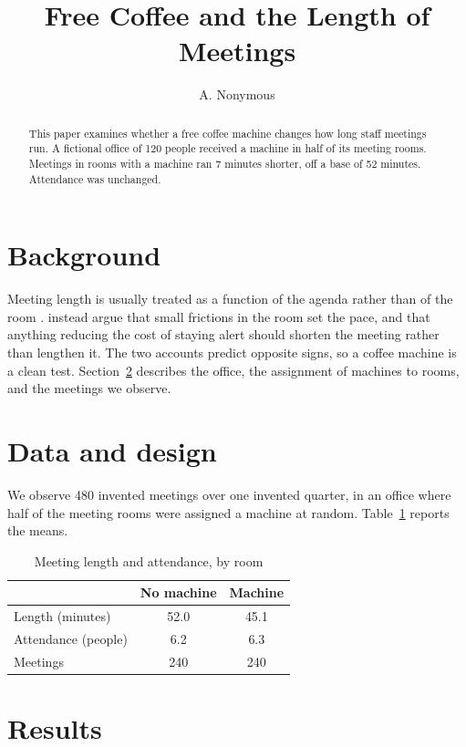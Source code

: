 \documentclass{article}
\title{Free Coffee and the Length of Meetings}
\author{A. Nonymous}
\date{}
\begin{document}
\maketitle

\begin{abstract}
This paper examines whether a free coffee machine changes how long staff
meetings run. A fictional office of 120 people received a machine in half of
its meeting rooms. Meetings in rooms with a machine ran 7 minutes shorter, off
a base of 52 minutes. Attendance was unchanged.
\end{abstract}

\section{Background}
\label{sec:background}

Meeting length is usually treated as a function of the agenda rather than of
the room \citep{doe2020example}. \citet{roe2019placeholder} instead argue that
small frictions in the room set the pace, and that anything reducing the cost
of staying alert should shorten the meeting rather than lengthen it. The two
accounts predict opposite signs, so a coffee machine is a clean test.
Section~\ref{sec:design} describes the office, the assignment of machines to
rooms, and the meetings we observe.

\section{Data and design}
\label{sec:design}

We observe 480 invented meetings over one invented quarter, in an office where
half of the meeting rooms were assigned a machine at random. Table~\ref{tab:main}
reports the means.

\begin{table}[ht]
\centering
\caption{Meeting length and attendance, by room}
\label{tab:main}
\begin{tabular}{lcc}
\toprule
 & No machine & Machine \\
\midrule
Length (minutes) & 52.0 & 45.1 \\
Attendance (people) & 6.2 & 6.3 \\
Meetings & 240 & 240 \\
\bottomrule
\end{tabular}
\end{table}

\section{Results}
\label{sec:results}
\end{document}
